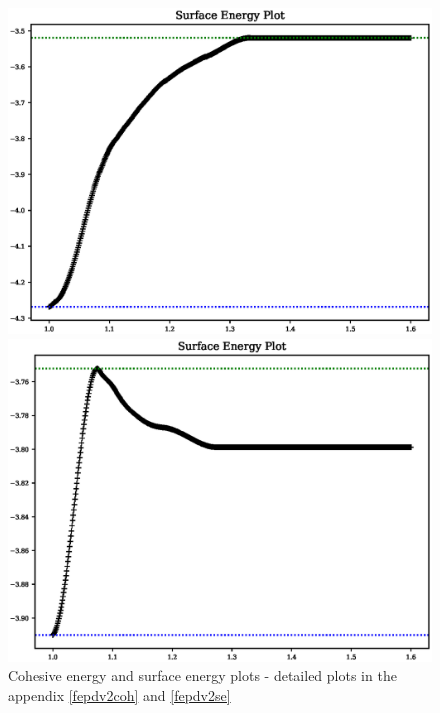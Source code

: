 \begin{figure}[ht]
  \centering
  \begin{minipage}[b]{0.4\linewidth}
    \centering
    \includegraphics[width=.98\linewidth]{chapters/results_potential_fitting/pot_fepd_fcc_2/fe_surface_energy.eps} 
  \end{minipage}%
  \begin{minipage}[b]{0.4\linewidth}
    \centering
    \includegraphics[width=.98\linewidth]{chapters/results_potential_fitting/pot_fepd_fcc_2/pd_surface_energy.eps} 
  \end{minipage}%
	\caption{Cohesive energy and surface energy plots - detailed plots in the appendix \ref{fepdv2coh} and \ref{fepdv2se}}  
\label{fig:v2plots}
\end{figure}
\FloatBarrier

